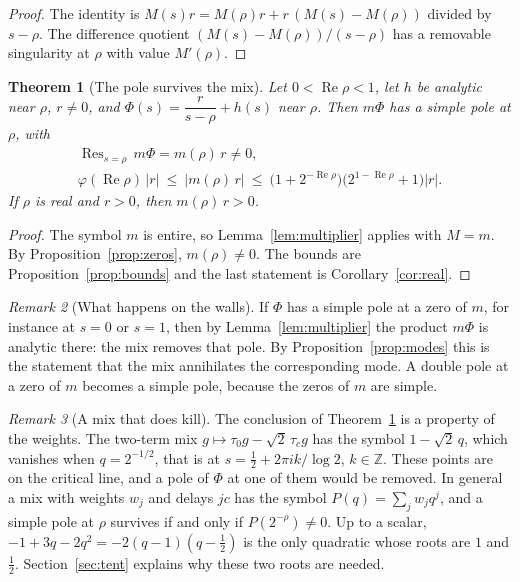 \documentclass[11pt]{amsart}
\newtheorem{theorem}{Theorem}[section]
\theoremstyle{definition}
\theoremstyle{remark}
\newtheorem{remark}[theorem]{Remark}
\DeclareMathOperator{\re}{Re}
\DeclareMathOperator*{\res}{Res}
\newcommand{\Z}{\mathbb{Z}}
\begin{document}
\begin{proof}
The identity is $M(s)r=M(\rho)r+r\,(M(s)-M(\rho))$ divided by $s-\rho$. The difference quotient
$(M(s)-M(\rho))/(s-\rho)$ has a removable singularity at $\rho$ with value $M'(\rho)$.
\end{proof}

\begin{theorem}[The pole survives the mix]\label{thm:pole}
Let $0<\re\rho<1$, let $h$ be analytic near $\rho$, $r\neq 0$, and
$\Phi(s)=\dfrac{r}{s-\rho}+h(s)$ near $\rho$. Then $m\Phi$ has a simple pole at $\rho$, with
\begin{gather*}
\res_{s=\rho}\,m\Phi=m(\rho)\,r\neq0,\\
\varphi(\re\rho)\,|r|\ \le\ |m(\rho)\,r|\ \le\ \bigl(1+2^{-\re\rho}\bigr)\bigl(2^{1-\re\rho}+1\bigr)|r| .
\end{gather*}
If $\rho$ is real and $r>0$, then $m(\rho)\,r>0$.
\end{theorem}

\begin{proof}
The symbol $m$ is entire, so Lemma~\ref{lem:multiplier} applies with $M=m$. By
Proposition~\ref{prop:zeros}, $m(\rho)\ne0$. The bounds are Proposition~\ref{prop:bounds} and the
last statement is Corollary~\ref{cor:real}.
\end{proof}

\begin{remark}[What happens on the walls]\label{rem:walls}
If $\Phi$ has a simple pole at a zero of $m$, for instance at $s=0$ or $s=1$, then by
Lemma~\ref{lem:multiplier} the product $m\Phi$ is analytic there: the mix removes that pole. By
Proposition~\ref{prop:modes} this is the statement that the mix annihilates the corresponding mode.
A double pole at a zero of $m$ becomes a simple pole, because the zeros of $m$ are simple.
\end{remark}

\begin{remark}[A mix that does kill]\label{rem:kills}
The conclusion of Theorem~\ref{thm:pole} is a property of the weights. The two-term mix
$g\mapsto \tau_0g-\sqrt2\,\tau_cg$ has the symbol $1-\sqrt2\,q$, which vanishes when
$q=2^{-1/2}$, that is at $s=\tfrac12+2\pi ik/\log2$, $k\in\Z$. These points are on the critical
line, and a pole of $\Phi$ at one of them would be removed. In general a mix with weights $w_j$ and
delays $jc$ has the symbol $P(q)=\sum_jw_jq^j$, and a simple pole at $\rho$ survives if and only if
$P(2^{-\rho})\ne0$. Up to a scalar, $-1+3q-2q^2=-2(q-1)(q-\tfrac12)$ is the only quadratic whose
roots are $1$ and $\tfrac12$. Section~\ref{sec:tent} explains why these two roots are needed.
\end{remark}
\end{document}
